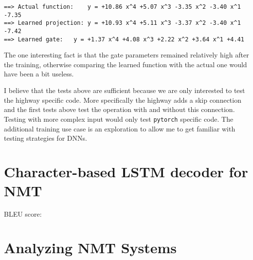 \documentclass{article}
\begin{document}
\begin{enumerate}
\begin{itemize}
\begin{verbatim}
==> Actual function:	y = +10.86 x^4 +5.07 x^3 -3.35 x^2 -3.40 x^1 -7.35
==> Learned projection:	y = +10.93 x^4 +5.11 x^3 -3.37 x^2 -3.40 x^1 -7.42
==> Learned gate:	y = +1.37 x^4 +4.08 x^3 +2.22 x^2 +3.64 x^1 +4.41
\end{verbatim}

The one interesting fact is that the gate parameters remained relatively high after the training, otherwise comparing the learned function with the actual one would have been a bit useless.

I believe that the tests above are sufficient because we are only interested to test the highway specific code. More specifically the highway adds a skip connection and the first tests above test the operation with and without this connection. Testing with more complex input would only test \texttt{pytorch} specific code. The additional training use case is an exploration to allow me to get familiar with testing strategies for DNNs.

\end{itemize}


\end{enumerate}

\clearpage


\section{Character-based LSTM decoder for NMT}

BLEU score:

\clearpage
\section{Analyzing NMT Systems}
\end{document}
